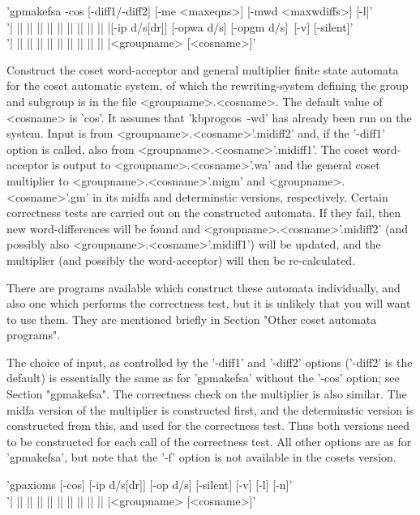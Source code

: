
'gpmakefsa  -cos [-diff1/-diff2] [-me <maxeqns>] [-mwd <maxwdiffs>] [-l]'\\
'| || || || || || || || || || |[-ip d/s[dr]] [-opwa d/s] [-opgm d/s]\
[-v] [-silent]'\\
'| || || || || || || || || || |<groupname> [<cosname>]'

Construct the coset word-acceptor and general multiplier finite state automata
for the coset automatic system, of which the rewriting-system defining
the group and subgroup is in the file <groupname>.<cosname>.
The default value of <cosname> is 'cos'.
It assumes that 'kbprogcos\ -wd' has already been run on the system.
Input is from <groupname>.<cosname>'.midiff2' and, if
the '-diff1' option is called, also from <groupname>.<cosname>'.midiff1'. The
coset word-acceptor is output to <groupname>.<cosname>'.wa' and the general
coset multiplier to <groupname>.<cosname>'.migm' and
<groupname>.<cosname>'.gm' in its midfa and determinstic versions,
respectively.  Certain correctness tests are carried out on the
constructed automata. If they fail, then new word-differences will be
found and <groupname>.<cosname>'.midiff2' (and possibly also
<groupname>.<cosname>'.midiff1')
will be updated, and the multiplier (and possibly the word-acceptor)
will then be re-calculated.

There are programs available which construct these automata individually,
and also one which performs the correctness test, but it is unlikely that
you will want to use them. They are mentioned briefly in
Section "Other coset automata programs".

The choice of input, as controlled by the '-diff1' and '-diff2'
options ('-diff2' is the default) is essentially the same as
for 'gpmakefsa' without the '-cos' option; see Section "gpmakefsa".
The correctness check on the multiplier is also similar. The
midfa version of the multiplier is constructed first, and the
determinstic version is constructed from this, and used for the
correctness test. Thus both versions need to be constructed for
each call of the correctness test.
All other options are as for 'gpmakefsa', but note that the
'-f' option is not available in the cosets version.


'gpaxioms [-cos] [-ip d/s[dr]] [-op d/s] [-silent] [-v] [-l] [-n]'\\
'| || || || || || || || || || |<groupname> [<cosname>]'

